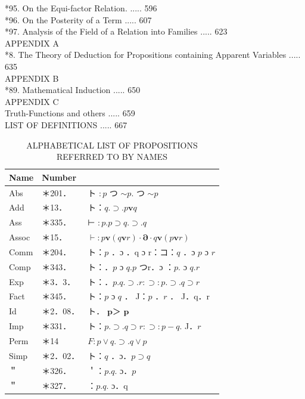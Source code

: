 \documentclass[10pt]{article}
\begin{document}
*95. On the Equi-factor Relation. ..... 596\\
*96. On the Posterity of a Term ..... 607\\
*97. Analysis of the Field of a Relation into Families ..... 623\\
APPENDIX A\\
*8. The Theory of Deduction for Propositions containing Apparent Variables ..... 635\\
APPENDIX B\\
*89. Mathematical Induction ..... 650\\
APPENDIX C\\
Truth-Functions and others ..... 659\\
LIST OF DEFINITIONS ..... 667

\begin{table}[h]
\begin{center}
\captionsetup{labelformat=empty}
\caption{ALPHABETICAL LIST OF PROPOSITIONS REFERRED TO BY NAMES}
\begin{tabular}{|l|l|l|}
\hline
Name & Number &  \\
\hline
Abs & ＊201． & ト $: p$ つ $\sim p$. つ $\sim p$ \\
\hline
Add & ＊13． & ト：$q . \supset . p \mathbf{v} q$ \\
\hline
Ass & ＊335． & ⊢ $: p . p \supset q . \supset . q$ \\
\hline
Assoc & ＊15． & $\vdash: p \mathbf{v}(q \mathbf{v} r) \cdot \boldsymbol{\partial} \cdot q \mathbf{v}(p \mathbf{v} r)$ \\
\hline
Comm & ＊204． & ト：$p$ ．ɔ ．q ɔ r：コ：$q$ ．ɔ $p$ ɔ $r$ \\
\hline
Comp & ＊343． & ト：．$p$ ɔ $q . p$ つr．ɔ ：$p$. ɔ $q . r$ \\
\hline
Exp & ＊3．3． & ト：．$p . q . \supset . r: \supset: p . \supset . q \supset r$ \\
\hline
Fact & ＊345． & ト：$p$ ɔ $q$ ． J：$p$ ．$r$ ． J．q．r \\
\hline
Id & ＊2．08． & ト． $\boldsymbol{p}$＞ $\boldsymbol{p}$ \\
\hline
Imp & ＊331． & ト：$p . \supset . q \supset r: \supset: p-q$. J．$r$ \\
\hline
Perm & ＊14 & $F: p \vee q . \supset . q \vee p$ \\
\hline
Simp & ＊2．02． & ト：$q$ ．ɔ．$p \supset q$ \\
\hline
＂ & ＊326． & ＇：$p . q$. ɔ．$p$ \\
\hline
＂ & ＊327． & ：$p . q$. ɔ．q \\

\end{tabular}
\end{center}
\end{table}
\end{document}
